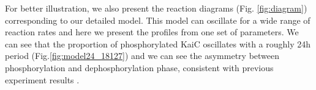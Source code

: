 \documentclass[a4paper,10pt]{article}
\numberwithin{equation}{section}
\begin{document}



For better illustration, we also present the reaction diagrams (Fig. \ref{fig:diagram}) corresponding to our detailed model. This model can oscillate for a wide range of reaction rates and here we present the profiles from one set of parameters. We can see  that the proportion of phosphorylated KaiC oscillates with a roughly 24h period (Fig.\ref{fig:model24_18127}) and we can see the asymmetry between phosphorylation and dephosphorylation phase, consistent with previous experiment results \citet{rust809,phong2012}. 
\end{document}
